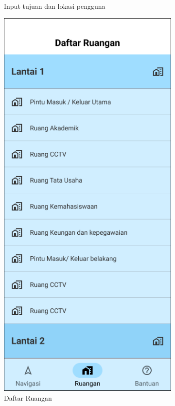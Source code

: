 \begin{enumerate}
\begin{figure} [H]
\begin{subfigure}{.5\textwidth}
 		\caption{Input tujuan dan lokasi pengguna}
	\end{subfigure}
		\vspace{1cm}
		\newline
	\begin{subfigure}{.5\textwidth}
 		\centering
	  	\includegraphics[width=.5\linewidth]{gambar/bab4/daftar-ruangan} 
 		\caption{Daftar Ruangan}
	\end{subfigure}
	\begin{subfigure}{.5\textwidth}
 		\centering

\end{subfigure}
\end{figure}
\end{enumerate}
